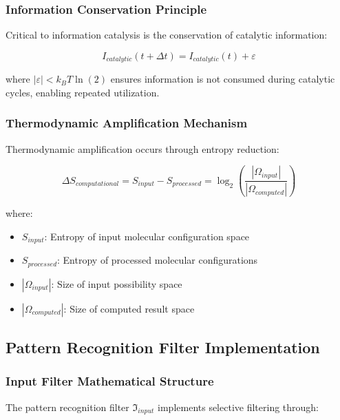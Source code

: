 \subsubsection{Information Conservation Principle}

Critical to information catalysis is the conservation of catalytic information:

\begin{equation}
I_{catalytic}(t + \Delta t) = I_{catalytic}(t) + \varepsilon
\end{equation}

where $|\varepsilon| < k_B T \ln(2)$ ensures information is not consumed during catalytic cycles, enabling repeated utilization.

\subsubsection{Thermodynamic Amplification Mechanism}

Thermodynamic amplification occurs through entropy reduction:

\begin{equation}
\Delta S_{computational} = S_{input} - S_{processed} = \log_2\left(\frac{|\Omega_{input}|}{|\Omega_{computed}|}\right)
\end{equation}

where:
\begin{itemize}
\item $S_{input}$: Entropy of input molecular configuration space
\item $S_{processed}$: Entropy of processed molecular configurations
\item $|\Omega_{input}|$: Size of input possibility space
\item $|\Omega_{computed}|$: Size of computed result space
\end{itemize}

\subsection{Pattern Recognition Filter Implementation}

\subsubsection{Input Filter Mathematical Structure}

The pattern recognition filter $\mathfrak{I}_{input}$ implements selective filtering through:

